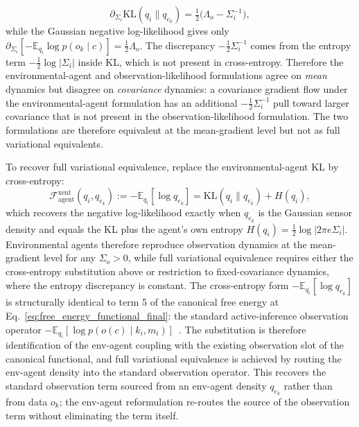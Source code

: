 \documentclass[11pt]{article}
\begin{document}
\begin{equation}
\partial_{\Sigma_i}\mathrm{KL}(q_i \| q_{e_k}) = \tfrac{1}{2}\big(\Lambda_o - \Sigma_i^{-1}\big),
\end{equation}
while the Gaussian negative log-likelihood gives only $\partial_{\Sigma_i}[-\mathbb{E}_{q_i}\log p(o_k \mid c)] = \tfrac{1}{2}\Lambda_o$. The discrepancy $-\tfrac{1}{2}\Sigma_i^{-1}$ comes from the entropy term $-\tfrac{1}{2}\log|\Sigma_i|$ inside KL, which is not present in cross-entropy. Therefore the environmental-agent and observation-likelihood formulations agree on \emph{mean} dynamics but disagree on \emph{covariance} dynamics: a covariance gradient flow under the environmental-agent formulation has an additional $-\tfrac{1}{2}\Sigma_i^{-1}$ pull toward larger covariance that is not present in the observation-likelihood formulation. The two formulations are therefore equivalent at the mean-gradient level but not as full variational equivalents.

To recover full variational equivalence, replace the environmental-agent KL by cross-entropy:
\begin{equation}
\mathcal{F}_{\text{agent}}^{\mathrm{xent}}(q_i, q_{e_k}) := -\mathbb{E}_{q_i}[\log q_{e_k}] = \mathrm{KL}(q_i \| q_{e_k}) + H(q_i),
\label{eq:xent_resolution}
\end{equation}
which recovers the negative log-likelihood exactly when $q_{e_k}$ is the Gaussian sensor density and equals the KL plus the agent's own entropy $H(q_i) = \tfrac{1}{2}\log|2\pi e \Sigma_i|$. Environmental agents therefore reproduce observation dynamics at the mean-gradient level for any $\Sigma_o > 0$, while full variational equivalence requires either the cross-entropy substitution above or restriction to fixed-covariance dynamics, where the entropy discrepancy is constant. The cross-entropy form $-\mathbb{E}_{q_i}[\log q_{e_k}]$ is structurally identical to term 5 of the canonical free energy at Eq.~\eqref{eq:free_energy_functional_final}: the standard active-inference observation operator $-\mathbb{E}_{q_i}[\log p(o(c)\mid k_i, m_i)]$~\cite{Friston2010, parr2022active}. The substitution is therefore identification of the env-agent coupling with the existing observation slot of the canonical functional, and full variational equivalence is achieved by routing the env-agent density into the standard observation operator. This recovers the standard observation term sourced from an env-agent density $q_{e_k}$ rather than from data $o_k$; the env-agent reformulation re-routes the source of the observation term without eliminating the term itself.
\end{document}
